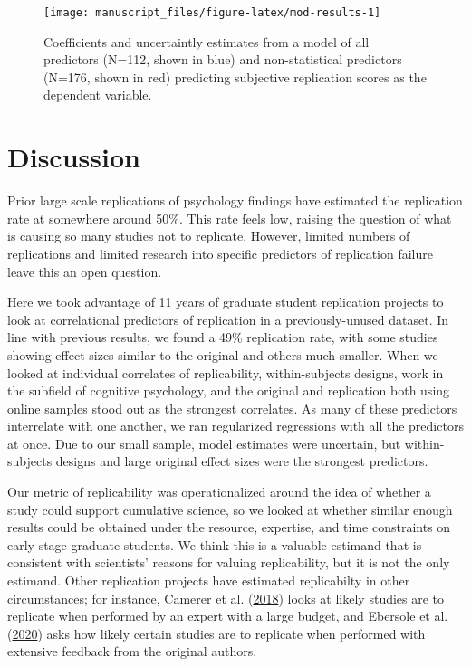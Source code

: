 \documentclass[
  english,
  a4paper,
]{article}
\begin{document}
\begin{figure}[ht]
\texttt{[image: manuscript\_files/figure-latex/mod-results-1]} \caption{Coefficients and uncertaintly estimates from a model of all predictors (N=112, shown in blue) and non-statistical predictors (N=176, shown in red) predicting subjective replication scores as the dependent variable. }\label{fig:mod-results}
\end{figure}

\hypertarget{discussion}{%
\section{Discussion}\label{discussion}}

Prior large scale replications of psychology findings have estimated the replication rate at somewhere around 50\%. This rate feels low, raising the question of what is causing so many studies not to replicate. However, limited numbers of replications and limited research into specific predictors of replication failure leave this an open question.

Here we took advantage of 11 years of graduate student replication projects to look at correlational predictors of replication in a previously-unused dataset. In line with previous results, we found a 49\% replication rate, with some studies showing effect sizes similar to the original and others much smaller. When we looked at individual correlates of replicability, within-subjects designs, work in the subfield of cognitive psychology, and the original and replication both using online samples stood out as the strongest correlates. As many of these predictors interrelate with one another, we ran regularized regressions with all the predictors at once. Due to our small sample, model estimates were uncertain, but within-subjects designs and large original effect sizes were the strongest predictors.

Our metric of replicability was operationalized around the idea of whether a study could support cumulative science, so we looked at whether similar enough results could be obtained under the resource, expertise, and time constraints on early stage graduate students. We think this is a valuable estimand that is consistent with scientists' reasons for valuing replicability, but it is not the only estimand. Other replication projects have estimated replicabilty in other circumstances; for instance, Camerer et al. (\protect\hyperlink{ref-camerer2018}{2018}) looks at likely studies are to replicate when performed by an expert with a large budget, and Ebersole et al. (\protect\hyperlink{ref-ebersole2020}{2020}) asks how likely certain studies are to replicate when performed with extensive feedback from the original authors.
\end{document}
